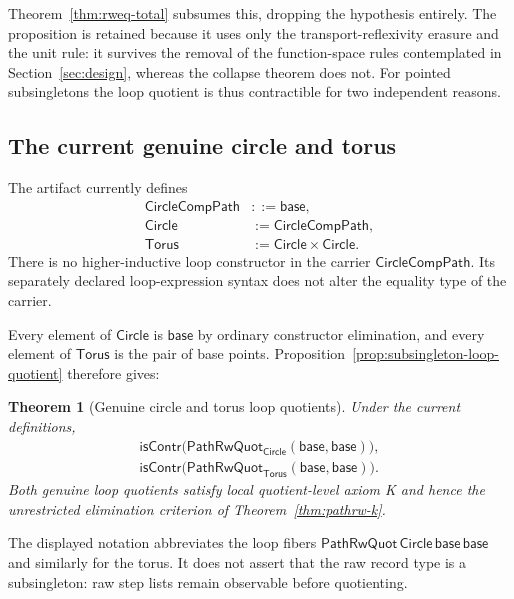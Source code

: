 \documentclass[10pt,reqno]{amsart}
\newtheorem{theorem}{Theorem}[section]
\newcommand{\isContr}{\mathsf{isContr}}
\newcommand{\PRW}{\mathsf{PathRwQuot}}
\begin{document}
Theorem~\ref{thm:rweq-total} subsumes this, dropping the hypothesis entirely.
The proposition is retained because it uses only the transport-reflexivity
erasure and the unit rule: it survives the removal of the function-space rules
contemplated in Section~\ref{sec:design}, whereas the collapse theorem does not.
For pointed subsingletons the loop quotient is thus contractible for two
independent reasons.

\subsection{The current genuine circle and torus}

The artifact currently defines
\[
 \begin{aligned}
  \mathsf{CircleCompPath}&::=\mathsf{base},\\
  \mathsf{Circle}&:=\mathsf{CircleCompPath},\\
  \mathsf{Torus}&:=\mathsf{Circle}\times\mathsf{Circle}.
 \end{aligned}
\tag{13.1}\label{eq:current-circle-torus}
\]
There is no higher-inductive loop constructor in the carrier
\(\mathsf{CircleCompPath}\).  Its separately declared loop-expression syntax
does not alter the equality type of the carrier.

Every element of \(\mathsf{Circle}\) is \(\mathsf{base}\) by ordinary
constructor elimination, and every element of \(\mathsf{Torus}\) is the pair
of base points.  Proposition~\ref{prop:subsingleton-loop-quotient} therefore
gives:

\begin{theorem}[Genuine circle and torus loop quotients]
\label{thm:genuine-circle-torus}
Under the current definitions,
\[
 \begin{aligned}
  \isContr\bigl(
    \PRW_{\mathsf{Circle}}(\mathsf{base},\mathsf{base})
  \bigr),\\
  \isContr\bigl(
    \PRW_{\mathsf{Torus}}(\mathsf{base},\mathsf{base})
  \bigr).
 \end{aligned}
\tag{13.2}\label{eq:genuine-contractible}
\]
Both genuine loop quotients satisfy local quotient-level axiom K and hence the
unrestricted elimination criterion of Theorem~\ref{thm:pathrw-k}.
\end{theorem}

The displayed notation abbreviates the loop fibers
\(\PRW\,\mathsf{Circle}\,\mathsf{base}\,\mathsf{base}\) and similarly for the
torus.  It does not assert that the raw record type is a subsingleton: raw step
lists remain observable before quotienting.
\end{document}
